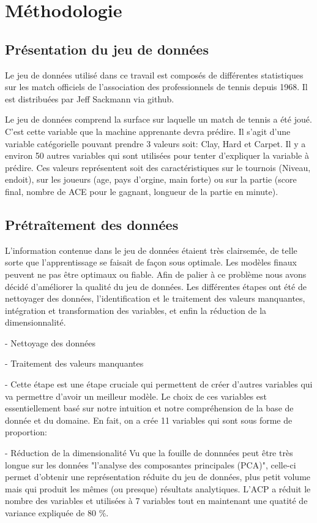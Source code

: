 \section{Méthodologie}

\subsection{Présentation du jeu de données}
Le jeu de données utilisé dans ce travail est composés de différentes statistiques sur les match officiels de l'association des professionnels de tennis depuis 1968. Il est distribuées par Jeff Sackmann via github. 

Le jeu de données comprend la surface sur laquelle un match de tennis a été joué. C'est cette variable que la machine apprenante devra prédire.  Il s'agit d'une variable catégorielle pouvant prendre 3 valeurs  soit: Clay, Hard et Carpet. Il y a environ 50 autres variables qui sont utilisées pour tenter d'expliquer la variable à prédire. Ces valeurs représentent soit des caractéristiques sur le tournois (Niveau, endoit), sur les joueurs (age, pays d'orgine, main forte) ou sur la partie (score final, nombre de ACE pour le gagnant, longueur de la partie en minute).


\subsection{Prétraîtement des données}
L'information contenue dans le jeu de données étaient très clairsemée, de telle sorte que l'apprentissage se faisait de façon sous optimale. Les modèles finaux peuvent ne pas être optimaux ou fiable. Afin de palier à ce problème nous avons décidé d'améliorer la qualité du jeu de données. Les différentes étapes ont été de nettoyager des données, l'identification et le traitement des valeurs manquantes, intégration et transformation des variables, et enfin la réduction de la dimensionnalité.

- Nettoyage des données

- Traitement des valeurs manquantes

-  
Cette étape est une étape cruciale qui permettent de créer d'autres variables qui va permettre d'avoir un meilleur modèle. Le choix de ces variables est essentiellement basé sur notre intuition et notre compréhension de la base de donnée et du domaine.
En fait, on a crée  11 variables qui sont sous forme de proportion:

- Réduction de la dimensionalité
Vu que la fouille de donnnées peut être très longue sur les données "l'analyse des composantes principales (PCA)", celle-ci permet d'obtenir une représentation réduite du jeu de données, plus petit volume mais qui produit les mêmes (ou presque) résultats analytiques. L'ACP a réduit le nombre des variables et  utilisées à 7 variables tout en maintenant une quatité de variance expliquée de 80 \%. 

